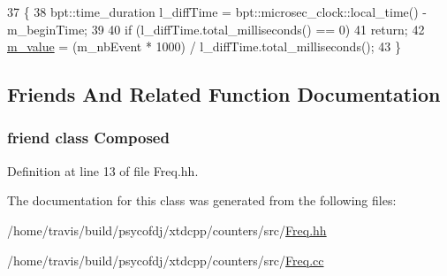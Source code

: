 \begin{DoxyCode}
37 \{
38   bpt::time\_duration l\_diffTime = bpt::microsec\_clock::local\_time() - m\_beginTime;
39 
40   \textcolor{keywordflow}{if} (l\_diffTime.total\_milliseconds() == 0)
41     \textcolor{keywordflow}{return};
42   \hyperlink{classxtd_1_1counters_1_1Value_abe06c1cebededaf2f216707171f63c3c}{m\_value} = (m\_nbEvent * 1000) / l\_diffTime.total\_milliseconds();
43 \}
\end{DoxyCode}


\subsection{Friends And Related Function Documentation}
\hypertarget{classxtd_1_1counters_1_1Freq_a93e934ad70d5b32b14beed5572450abf}{
\subsubsection[{Composed}]{\setlength{\rightskip}{0pt plus 5cm}friend class {\bf Composed}\hspace{0.3cm}{\ttfamily [friend]}}}\label{classxtd_1_1counters_1_1Freq_a93e934ad70d5b32b14beed5572450abf}


Definition at line 13 of file Freq.\-hh.



The documentation for this class was generated from the following files\-:\begin{DoxyCompactItemize}
\item 
/home/travis/build/psycofdj/xtdcpp/counters/src/\hyperlink{Freq_8hh}{Freq.\-hh}\item 
/home/travis/build/psycofdj/xtdcpp/counters/src/\hyperlink{Freq_8cc}{Freq.\-cc}\end{DoxyCompactItemize}
